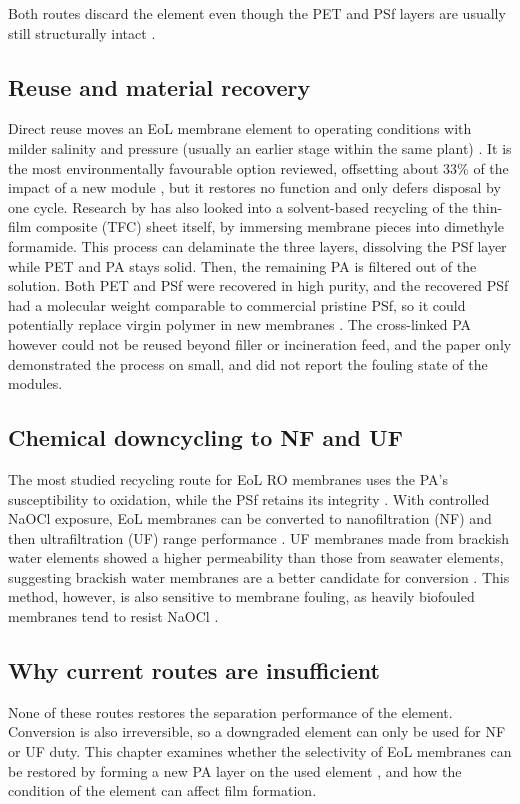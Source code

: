 Both routes discard the element even though the PET and PSf layers are usually still structurally intact \citep{Molinaa2018}.

\subsection{Reuse and material recovery}
\label{sec:reuse}
Direct reuse moves an EoL membrane element to operating conditions with milder salinity and pressure (usually an earlier stage within the same plant) \citep{GarciaPacheco2015}. It is the most environmentally favourable option reviewed, offsetting about 33\% of the impact of a new module \citep{Lawler2015}, but it restores no function and only defers disposal by one cycle. Research by \citet{Guclu2022} has also looked into a solvent-based recycling of the thin-film composite (TFC) sheet itself, by immersing membrane pieces into dimethyle formamide. This process can delaminate the three layers, dissolving the PSf layer while PET and PA stays solid. Then, the remaining PA is filtered out of the solution. Both PET and PSf were recovered in high purity, and the recovered PSf had a molecular weight comparable to commercial pristine PSf, so it could potentially replace virgin polymer in new membranes \citep{Guclu2022}. The cross-linked PA however could not be reused beyond filler or incineration feed, and the paper only demonstrated the process on small,  and did not report the fouling state of the modules. 

\subsection{Chemical downcycling to NF and UF}
\label{sec:downcycling}
The most studied recycling route for EoL RO membranes uses the PA's susceptibility to oxidation, while the PSf retains its integrity \citep{GarciaPacheco2015,Molinaa2018}. With controlled NaOCl exposure, EoL membranes can be converted to nanofiltration (NF) and then ultrafiltration (UF) range performance \citep{GarciaPacheco2015}. UF membranes made from brackish water elements showed a higher permeability than those from seawater elements, suggesting brackish water membranes are a better candidate for conversion \citep{GarciaPacheco2015}. This method, however, is also sensitive to membrane fouling, as heavily biofouled membranes tend to resist NaOCl \citep{Molinaa2018}.\\

\subsection{Why current routes are insufficient}
None of these routes restores the separation performance  of the element. Conversion is also irreversible, so a downgraded element can only be used for NF or UF duty. This chapter examines whether the selectivity of EoL membranes can be restored by forming a new PA layer on the used element \citep{Ogbe2025,Ogbe2026}, and how the condition of the element can affect film formation. 

